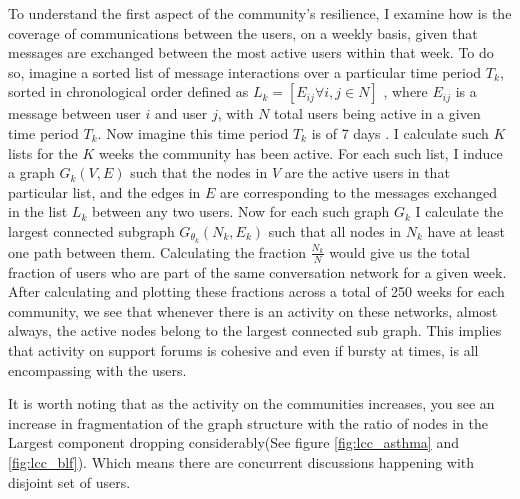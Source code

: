 To understand the first aspect of the community's resilience, I examine how is the coverage of communications between the users, on a weekly basis, given that messages are exchanged between the most active users within that week. 
To do so, imagine a sorted list of message interactions over a particular time period $T_k$, sorted in chronological order defined as $L_k=[E_{ij} \forall i,j \in N]$ , where $E_{ij}$ is a message between user $i$ and user $j$, with $N$ total users being active in a given time period $T_k$. Now imagine this time period $T_k$ is of 7 days . I calculate such $K$ lists for the $K$ weeks the community has been active. For each such list, I induce a graph $G_k(V,E)$ such that the nodes in $V$ are the active users in that particular list, and the edges in $E$ are corresponding to the messages exchanged in the list $L_k$ between any two users. 
Now for each such graph $G_k$ I calculate the largest connected subgraph $G_{\theta_k}(N_k,E_k)$ such that all nodes in $N_k$ have at least one path between them. Calculating the fraction $\frac{N_k}{N}$ would give us the total fraction of users who are part of the same conversation network for a given week. After calculating and plotting these fractions across a total of 250 weeks for each community, we see that whenever there is an activity on these networks, almost always, the active nodes belong to the largest connected sub graph. This implies that activity on support forums is cohesive and even if bursty at times, is all encompassing with the users. 

It is worth noting that as the activity on the communities increases, you see an increase in fragmentation of the graph structure with the ratio of nodes in the Largest component dropping considerably(See figure \ref{fig:lcc_asthma} and \ref{fig:lcc_blf}). Which means there are concurrent discussions  happening with disjoint set of users. 




